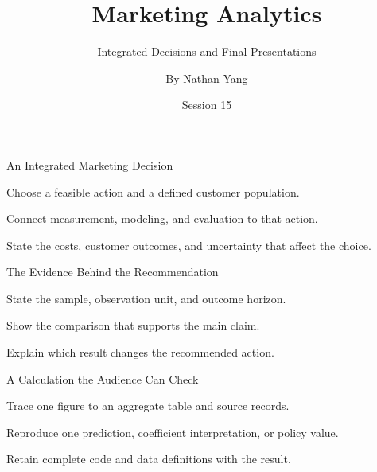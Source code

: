 
\title{Marketing Analytics}
\subtitle{Integrated Decisions and Final Presentations}
\author{By Nathan Yang}
\date{Session 15}

\begin{frame}
\titlepage
\end{frame}
\begin{frame}{An Integrated Marketing Decision}
\vfill
\begin{slidebullets}
\item Choose a feasible action and a defined customer population.
\item Connect measurement, modeling, and evaluation to that action.
\item State the costs, customer outcomes, and uncertainty that affect the choice.
\end{slidebullets}
\vfill
{}
\end{frame}
\begin{frame}{The Evidence Behind the Recommendation}
\vfill
\begin{slidebullets}
\item State the sample, observation unit, and outcome horizon.
\item Show the comparison that supports the main claim.
\item Explain which result changes the recommended action.
\end{slidebullets}
\vfill
{}
\end{frame}
\begin{frame}{A Calculation the Audience Can Check}
\vfill
\begin{slidebullets}
\item Trace one figure to an aggregate table and source records.
\item Reproduce one prediction, coefficient interpretation, or policy value.
\item Retain complete code and data definitions with the result.
\end{slidebullets}
\vfill
{}
\end{frame}
